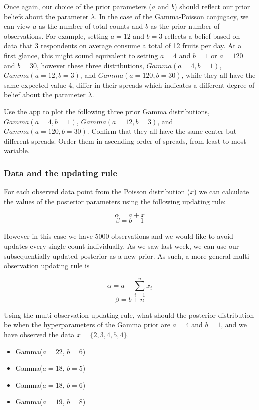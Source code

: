 \documentclass[
]{article}
\providecommand{\tightlist}{%
  \setlength{\itemsep}{0pt}\setlength{\parskip}{0pt}}
\begin{document}
Once again, our choice of the prior parameters (\(a\) and \(b\)) should
reflect our prior beliefs about the parameter \(\lambda\). In the case
of the Gamma-Poisson conjugacy, we can view \(a\) as the number of total
counts and \(b\) as the prior number of observations. For example,
setting \(a = 12\) and \(b = 3\) reflects a belief based on data that 3
respondents on average consume a total of 12 fruits per day. At a first
glance, this might sound equivalent to setting \(a = 4\) and \(b = 1\)
or \(a = 120\) and \(b = 30\), however these three distributions,
\(Gamma(a = 4, b = 1)\), \(Gamma(a = 12, b = 3)\), and
\(Gamma(a = 120, b = 30)\), while they all have the same expected value
4, differ in their spreads which indicates a different degree of belief
about the parameter \(\lambda\).

Use the app to plot the following three prior Gamma distributions,
\(Gamma(a = 4, b = 1)\), \(Gamma(a = 12, b = 3)\), and
\(Gamma(a = 120, b = 30)\). Confirm that they all have the same center
but different spreads. Order them in ascending order of spreads, from
least to most variable.

\hypertarget{data-and-the-updating-rule-1}{%
\subsubsection{Data and the updating
rule}\label{data-and-the-updating-rule-1}}

For each observed data point from the Poisson distribution (\(x\)) we
can calculate the values of the posterior parameters using the following
updating rule:

\[ \alpha = a + x \] \[ \beta = b + 1 \]

However in this case we have 5000 observations and we would like to
avoid updates every single count individually. As we saw last week, we
can use our subsequentially updated posterior as a new prior. As such, a
more general multi-observation updating rule is

\[ \alpha = a + \sum_{i = 1}^n x_i \] \[ \beta = b + n \]

Using the multi-observation updating rule, what should the posterior
distribution be when the hyperparameters of the Gamma prior are
\(a = 4\) and \(b = 1\), and we have observed the data
\(x = \{2, 3, 4, 5, 4\}\).

\begin{itemize}
\tightlist
\item
  Gamma(\(a = 22\), \(b = 6\))
\item
  Gamma(\(a = 18\), \(b = 5\))
\item
  Gamma(\(a = 18\), \(b = 6\))
\item
  Gamma(\(a = 19\), \(b = 8\))
\end{itemize}
\end{document}
